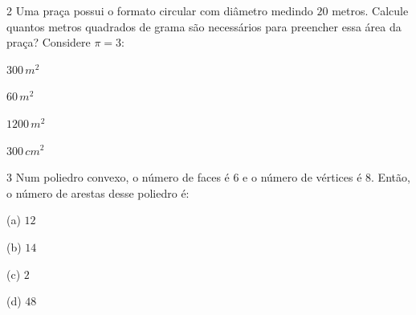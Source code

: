\num{2}  Uma praça possui o formato circular com diâmetro medindo $20$ metros.
Calcule quantos metros quadrados de grama são necessários para preencher
essa área da praça? Considere $π = 3$:

\begin{multicols}{2}
\begin{escolha}
\item $300\,m^2$
\item $60\,m^2$
\item $1200\,m^2$
\item $300\,cm^2$
\end{escolha}
\end{multicols}



\num{3}  Num poliedro convexo, o número de faces é $6$ e o número de vértices é
$8$. Então, o número de arestas desse poliedro é:

(a) $12$

(b) $14$

(c) $2$

(d) $48$


